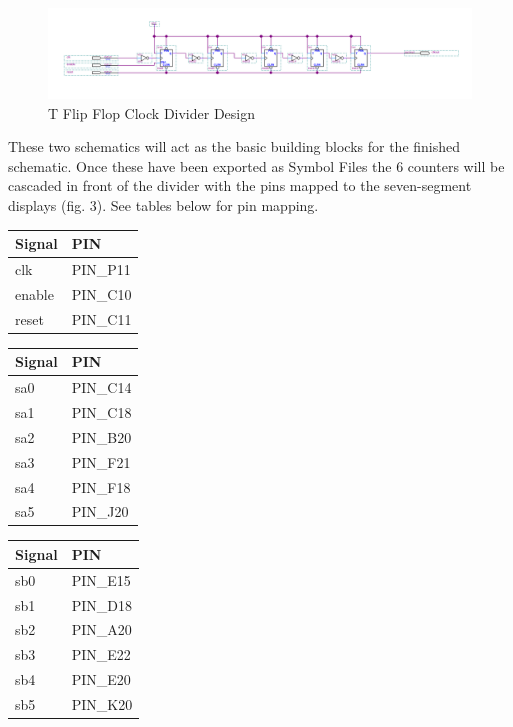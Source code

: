 \documentclass{article}
\begin{document}
\begin{figure}[H]
  \centering
  \includegraphics*[width=1\linewidth]{divider.png}
  \caption{T Flip Flop Clock Divider Design}  
\end{figure}

These two schematics will act as the basic building blocks for the finished schematic. Once these have been exported as Symbol Files the 6 counters will be cascaded in front of the divider with the pins mapped to the seven-segment displays (fig. 3). See tables below for pin mapping.

\begin{table}[H]
  \centering
  \begin{minipage}[t]{0.3\textwidth}
    \centering
    \begin{tabular}{ll}
    \textbf{Signal} & \textbf{PIN} \\
    \hline
    clk   & PIN\_P11 \\
    enable & PIN\_C10 \\
    reset & PIN\_C11 \\
    \end{tabular}%
    \label{tab:pin_assignments1}%
  \end{minipage}\hfill
  \begin{minipage}[t]{0.3\textwidth}
    \centering
    \begin{tabular}{ll}
    \textbf{Signal} & \textbf{PIN} \\
    \hline
    sa0   & PIN\_C14 \\
    sa1   & PIN\_C18 \\
    sa2   & PIN\_B20 \\
    sa3   & PIN\_F21 \\
    sa4   & PIN\_F18 \\
    sa5   & PIN\_J20 \\
    \end{tabular}%
    \label{tab:pin_assignments2}%
  \end{minipage}\hfill
  \begin{minipage}[t]{0.3\textwidth}
    \centering
    \begin{tabular}{ll}
    \textbf{Signal} & \textbf{PIN} \\
    \hline
    sb0   & PIN\_E15 \\
    sb1   & PIN\_D18 \\
    sb2   & PIN\_A20 \\
    sb3   & PIN\_E22 \\
    sb4   & PIN\_E20 \\
    sb5   & PIN\_K20 \\
    \end{tabular}%
    \label{tab:pin_assignments3}%
  \end{minipage}
\end{table}%
\end{document}

